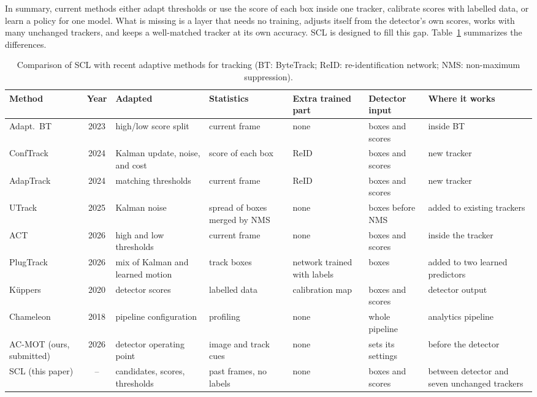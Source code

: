 \documentclass[pdflatex,referee,sn-mathphys-num]{sn-jnl}
\newcommand{\scl}{SCL}
\begin{document}
In summary, current methods either adapt thresholds or use the score of each
box inside one tracker, calibrate scores with labelled data, or learn a policy
for one model. What is missing is a layer that needs no training, adjusts itself
from the detector's own scores, works with many unchanged trackers, and keeps
a well-matched tracker at its own accuracy. \scl{} is designed to fill this
gap. Table~\ref{tab:related} summarizes the differences.

\begin{table}[t]
\caption{Comparison of \scl{} with recent adaptive methods for tracking (BT: ByteTrack; ReID: re-identification network; NMS: non-maximum suppression).}
\label{tab:related}
\centering\footnotesize
\setlength{\tabcolsep}{3pt}
\begin{tabular}{@{}>{\raggedright\arraybackslash}p{18mm}c>{\raggedright\arraybackslash}p{21mm}>{\raggedright\arraybackslash}p{19mm}>{\raggedright\arraybackslash}p{15mm}>{\raggedright\arraybackslash}p{16mm}>{\raggedright\arraybackslash}p{21mm}@{}}
\toprule
Method & Year & Adapted & Statistics & Extra trained part & Detector input & Where it works\\
\midrule
Adapt.\ BT \cite{ma2023adaptivebytetrack} & 2023 & high/low score split & current frame & none & boxes and scores & inside BT\\
ConfTrack \cite{jung2024conftrack} & 2024 & Kalman update, noise, and cost & score of each box & ReID & boxes and scores & new tracker\\
AdapTrack \cite{shim2024adaptrack} & 2024 & matching thresholds & current frame & ReID & boxes and scores & new tracker\\
UTrack \cite{solano2025utrack} & 2025 & Kalman noise & spread of boxes merged by NMS & none & boxes before NMS & added to existing trackers\\
ACT \cite{act2026adaptive} & 2026 & high and low thresholds & current frame & none & boxes and scores & inside the tracker\\
PlugTrack \cite{kim2026plugtrack} & 2026 & mix of Kalman and learned motion & track boxes & network trained with labels & boxes & added to two learned predictors\\
K{\"u}ppers \cite{kuppers2020detcalib} & 2020 & detector scores & labelled data & calibration map & boxes and scores & detector output\\
Chameleon \cite{jiang2018chameleon} & 2018 & pipeline configuration & profiling & none & whole pipeline & analytics pipeline\\
AC-MOT (ours, submitted) & 2026 & detector operating point & image and track cues & none & sets its settings & before the detector\\
\scl{} (this paper) & -- & candidates, scores, thresholds & past frames, no labels & none & boxes and scores & between detector and seven unchanged trackers\\
\bottomrule
\end{tabular}
\end{table}
\end{document}
